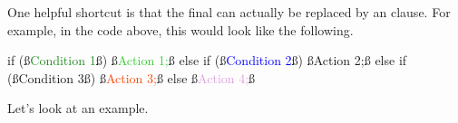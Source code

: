 One helpful shortcut is that the final  can actually be replaced by an  clause. For example, in the code above, this would look like the following.

\begin{code}
if (ß\textcolor{ForestGreen}{Condition 1}ß) 
{
    ß\textcolor{LimeGreen}{Action 1;}ß
}
else if (ß\textcolor{Blue}{Condition 2}ß)
{
    ß\textcolor{Cerulean}{Action 2;}ß
}
else if (ß\textcolor{Mahogany}{Condition 3}ß)
{
    ß\textcolor{OrangeRed}{Action 3;}ß
}
else
{
    ß\textcolor{Plum}{Action 4;}ß
}
\end{code}


Let's look at an example.

